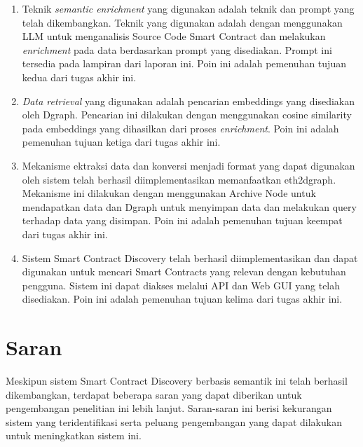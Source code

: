 \begin{enumerate}
    \item Teknik \textit{semantic enrichment} yang digunakan adalah teknik dan prompt yang telah dikembangkan. Teknik yang digunakan adalah dengan menggunakan LLM untuk menganalisis Source Code Smart Contract dan melakukan \textit{enrichment} pada data berdasarkan prompt yang disediakan. Prompt ini tersedia pada lampiran dari laporan ini. Poin ini adalah pemenuhan tujuan kedua dari tugas akhir ini.
    \item \textit{Data retrieval} yang digunakan adalah pencarian embeddings yang disediakan oleh Dgraph. Pencarian ini dilakukan dengan menggunakan cosine similarity pada embeddings yang dihasilkan dari proses \textit{enrichment}. Poin ini adalah pemenuhan tujuan ketiga dari tugas akhir ini.
    \item Mekanisme ektraksi data dan konversi menjadi format yang dapat digunakan oleh sistem telah berhasil diimplementasikan memanfaatkan eth2dgraph. Mekanisme ini dilakukan dengan menggunakan Archive Node untuk mendapatkan data dan Dgraph untuk menyimpan data dan melakukan query terhadap data yang disimpan. Poin ini adalah pemenuhan tujuan keempat dari tugas akhir ini.
    \item Sistem Smart Contract Discovery telah berhasil diimplementasikan dan dapat digunakan untuk mencari Smart Contracts yang relevan dengan kebutuhan pengguna. Sistem ini dapat diakses melalui API dan Web GUI yang telah disediakan. Poin ini adalah pemenuhan tujuan kelima dari tugas akhir ini.
\end{enumerate}
 
\section{Saran}
Meskipun sistem Smart Contract Discovery berbasis semantik ini telah berhasil dikembangkan, terdapat beberapa saran yang dapat diberikan untuk pengembangan penelitian ini lebih lanjut. Saran-saran ini berisi kekurangan sistem yang teridentifikasi serta peluang pengembangan yang dapat dilakukan untuk meningkatkan sistem ini.

